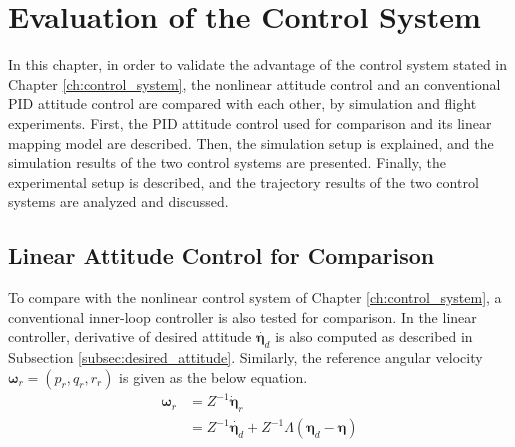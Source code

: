\chapter{Evaluation of the Control System}
\label{ch:evaluation}

In this chapter, in order to validate the advantage of the control system stated in Chapter \ref{ch:control_system}, the nonlinear attitude control and an conventional PID attitude control are compared with each other, by simulation and flight experiments. First, the PID attitude control used for comparison and its linear mapping model are described. Then, the simulation setup is explained, and the simulation results of the two control systems are presented. Finally, the experimental setup is described, and the trajectory results of the two control systems are analyzed and discussed.

\section{Linear Attitude Control for Comparison}
\label{sec:pid}

To compare with the nonlinear control system of Chapter \ref{ch:control_system}, a conventional inner-loop controller is also tested for comparison. In the linear controller, derivative of desired attitude \( \dot{ {\boldsymbol \eta}_d } \) is also computed as described in Subsection \ref{subsec:desired_attitude}. Similarly, the reference angular velocity \({\boldsymbol \omega}_r = (p_r, q_r, r_r)\) is given as the below equation.\\
\begin{equation}
\begin{aligned}
{\boldsymbol \omega}_r & = Z^{-1} \dot{\boldsymbol \eta}_r \\
&  = Z^{-1} \dot{ {\boldsymbol \eta}_d } +  Z^{-1} \Lambda ({\boldsymbol \eta}_d - {\boldsymbol \eta})\\
\end{aligned}
\end{equation}

